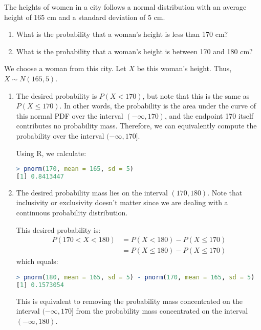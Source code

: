 \begin{exmp}\label{exmp:women_heights}
    The heights of women in a city follows a normal distribution with an average height of 165 cm and a standard deviation of 5 cm.
    \begin{enumerate}
        \item What is the probability that a woman's height is less than 170 cm?
        \item What is the probability that a woman's height is between 170 and 180 cm?
    \end{enumerate}
\end{exmp}
\begin{solution}
    We choose a woman from this city.
    Let \( X \) be this woman's height.
    Thus, \( X \sim N(165, 5) \).
    \begin{enumerate}
        \item The desired probability is \( P(X < 170) \), but note that this is the same as \( P(X \leq 170) \).
        In other words, the probability is the area under the curve of this normal PDF over the interval \( (-\infty, 170) \),
        and the endpoint 170 itself contributes no probability mass.
        Therefore, we can equivalently compute the probability over the interval \( (-\infty, 170] \).

        Using R, we calculate:
        \begin{lstlisting}[language=R]
> pnorm(170, mean = 165, sd = 5)
[1] 0.8413447
        \end{lstlisting}
        \item The desired probability mass lies on the interval \( (170, 180) \).
        Note that inclusivity or exclusivity doesn't matter since we are dealing with a continuous probability distribution.

        This desired probability is:
        \begin{align*}
            P(170 < X < 180) &= P(X < 180) - P(X \leq 170)\\
            &= P(X \leq 180) - P(X \leq 170)
        \end{align*}
        which equals:
        \begin{lstlisting}[language=R]
> pnorm(180, mean = 165, sd = 5) - pnorm(170, mean = 165, sd = 5)
[1] 0.1573054
        \end{lstlisting}
        This is equivalent to removing the probability mass concentrated on the interval \( (-\infty, 170] \) from the probability mass concentrated on the interval \( (-\infty, 180) \).
    \end{enumerate}
\end{solution}
